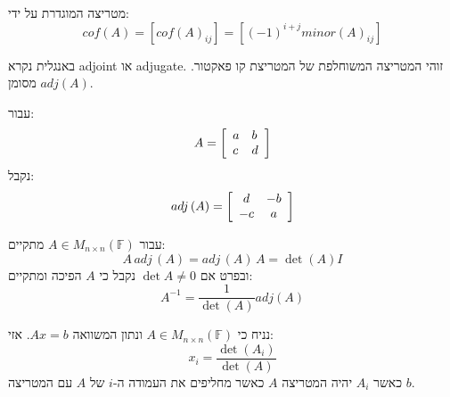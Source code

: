 \documentclass{tstextbook}
\begin{document}
\begin{definition}
מטריצה המוגדרת על ידי:
$$cof(A)=[cof(A)_{ij}]=[(-1)^{i+j}m i n o r(A)_{i j}]$$

\end{definition}
\begin{definition}
באנגלית נקרא adjoint או adjugate. זוהי המטריצה המשוחלפת של המטריצת קו פאקטור. מסומן \(adj(A)\).

\end{definition}
\begin{example}
עבור:
$$A={\left[\begin{array}{l l}{a}&{b}\\ {c}&{d}\end{array}\right]}$$
נקבל:
$$a d j\left(A\right)=\left[\begin{array}{c c}{{d}}&{{-b}}\\ {{-c}}&{{a}}\end{array}\right]$$

\end{example}
\begin{proposition}
עבור \(A \in M_{n\times n}\left( \mathbb{F}  \right)\) מתקיים:
$$A\,a d j\,(A)=a d j\,(A)\,A=\operatorname*{det}{(A)I}$$
ובפרט אם \(\det A\neq 0\) נקבל כי \(A\) הפיכה ומתקיים:
$$A^{-1}=\frac{1}{\operatorname*{det}\left(A\right)}a d j\left(A\right)$$

\end{proposition}
\begin{proposition}
נניח כי \(A \in M_{n\times n}\left( \mathbb{F}  \right)\) ונתון המשוואה \(Ax=b\). אזי:
$$x_{i}=\frac{\det(A_{i})}{\det (A)}$$
כאשר \(A_{i}\) יהיה המטריצה \(A\) כאשר מחליפים את העמודה ה-\(i\) של \(A\) עם המטריצה \(b\).

\end{proposition}
\end{document}
